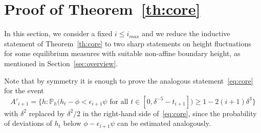 \documentclass[AHL,Unicode,longabstracts,published]{cedram}
\renewcommand{\P}{\mathbb{P}}
\newcommand{\eps}{\epsilon}
\begin{document}
\section{Proof of Theorem~\ref{th:core}}\label{sec:core}

In this section, we consider a fixed $i\le i_{max}$ and we reduce the inductive statement of Theorem~\ref{th:core} to two sharp statements on height fluctuations for some equilibrium measures with suitable non-affine boundary height, as mentioned in Section~\ref{sec:overview}.


Note that by symmetry it is enough to prove the analogous statement~\eqref{eq:core} for the event
\begin{equation}
A'_{i+1}=\Big\{h:\P_h\Big(h_t-\phi<\eps_{i+1}\psi \text{ for all }t\in \left[0,\delta^{-5}-t_{i+1}\right]\Big)\geq 1 -2(i+1)\delta^3 \Big\}
\end{equation}
with $\delta^2$ replaced by $\delta^2/2$ in the right-hand side of~\eqref{eq:core}, since the probability of deviations of $h_t$ below $\phi-\epsilon_{i+1}\psi$ can be estimated analogously.
\end{document}
